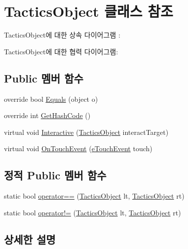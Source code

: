 \hypertarget{class_tactics_object}{}\section{Tactics\+Object 클래스 참조}
\label{class_tactics_object}


Tactics\+Object에 대한 상속 다이어그램 \+: 


Tactics\+Object에 대한 협력 다이어그램\+:
\subsection*{Public 멤버 함수}
\begin{DoxyCompactItemize}
\item 
override bool \hyperlink{class_tactics_object_aa445b127fafc61d84a064b423a155c1a}{Equals} (object o)
\item 
override int \hyperlink{class_tactics_object_a5fe0e8c99cec56daa7909754f037ac26}{Get\+Hash\+Code} ()
\item 
virtual void \hyperlink{class_tactics_object_a5f94ed01497a7072a2785163f4cbc57b}{Interactive} (\hyperlink{class_tactics_object}{Tactics\+Object} interact\+Target)
\item 
virtual void \hyperlink{class_tactics_object_a0353d47981c71db7fe32bd414f025e9b}{On\+Touch\+Event} (\hyperlink{_touch_manager_8cs_ae33e321a424fe84ba8b2fdb81ad40a68}{e\+Touch\+Event} touch)
\end{DoxyCompactItemize}
\subsection*{정적 Public 멤버 함수}
\begin{DoxyCompactItemize}
\item 
static bool \hyperlink{class_tactics_object_a18f2979a4bf81dc755fbc17e425809f0}{operator==} (\hyperlink{class_tactics_object}{Tactics\+Object} lt, \hyperlink{class_tactics_object}{Tactics\+Object} rt)
\item 
static bool \hyperlink{class_tactics_object_a49e235618a22126faa6271243cd89710}{operator!=} (\hyperlink{class_tactics_object}{Tactics\+Object} lt, \hyperlink{class_tactics_object}{Tactics\+Object} rt)
\end{DoxyCompactItemize}


\subsection{상세한 설명}


